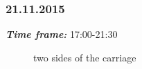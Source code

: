 \subsubsection{21.11.2015}
\textit{\textbf{Time frame:}} 17:00-21:30 \newline


\begin{figure}[H]
	\begin{minipage}[h]{1\linewidth}
		\caption{two sides of the carriage}
	\end{minipage}
\end{figure}

